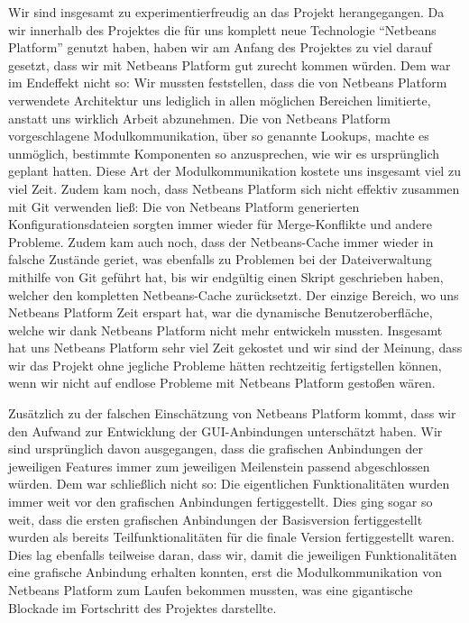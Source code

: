 Wir sind insgesamt zu experimentierfreudig an das Projekt herangegangen. Da wir innerhalb des Projektes die für uns komplett neue Technologie ``Netbeans Platform'' genutzt haben, haben wir am Anfang des Projektes zu viel darauf gesetzt, dass wir mit Netbeans Platform gut zurecht kommen würden. Dem war im Endeffekt nicht so: Wir mussten feststellen, dass die von Netbeans Platform verwendete Architektur uns lediglich in allen möglichen Bereichen limitierte, anstatt uns wirklich Arbeit abzunehmen. Die von Netbeans Platform vorgeschlagene Modulkommunikation, über so genannte Lookups, machte es unmöglich, bestimmte Komponenten so anzusprechen, wie wir es ursprünglich geplant hatten. Diese Art der Modulkommunikation kostete uns insgesamt viel zu viel Zeit. Zudem kam noch, dass Netbeans Platform sich nicht effektiv zusammen mit Git verwenden ließ: Die von Netbeans Platform generierten Konfigurationsdateien sorgten immer wieder für Merge-Konflikte und andere Probleme. Zudem kam auch noch, dass der Netbeans-Cache immer wieder in falsche Zustände geriet, was ebenfalls zu Problemen bei der Dateiverwaltung mithilfe von Git geführt hat, bis wir endgültig einen Skript geschrieben haben, welcher den kompletten Netbeans-Cache zurücksetzt. Der einzige Bereich, wo uns Netbeans Platform Zeit erspart hat, war die dynamische Benutzeroberfläche, welche wir dank Netbeans Platform nicht mehr entwickeln mussten. Insgesamt hat uns Netbeans Platform sehr viel Zeit gekostet und wir sind der Meinung, dass wir das Projekt ohne jegliche Probleme hätten rechtzeitig fertigstellen können, wenn wir nicht auf endlose Probleme mit Netbeans Platform gestoßen wären.

Zusätzlich zu der falschen Einschätzung von Netbeans Platform kommt, dass wir den Aufwand zur Entwicklung der GUI-Anbindungen unterschätzt haben. Wir sind ursprünglich davon ausgegangen, dass die grafischen Anbindungen der jeweiligen Features immer zum jeweiligen Meilenstein passend abgeschlossen würden. Dem war schließlich nicht so: Die eigentlichen Funktionalitäten wurden immer weit vor den grafischen Anbindungen fertiggestellt. Dies ging sogar so weit, dass die ersten grafischen Anbindungen der Basisversion fertiggestellt wurden als bereits Teilfunktionalitäten für die finale Version fertiggestellt waren. Dies lag ebenfalls teilweise daran, dass wir, damit die jeweiligen Funktionalitäten eine grafische Anbindung erhalten konnten, erst die Modulkommunikation von Netbeans Platform zum Laufen bekommen mussten, was eine gigantische Blockade im Fortschritt des Projektes darstellte.

